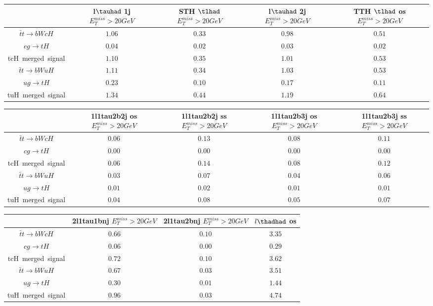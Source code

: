 \centering
\begin{tabular}{|c|c|c|c|c|} \hline
 & l$\tauhad$ 1j  $E_T^{miss}>20GeV$ & STH $\tlhad$   $E_T^{miss}>20GeV$ & l$\tauhad$ 2j  $E_T^{miss}>20GeV$ & TTH $\tlhad$ os  $E_T^{miss}>20GeV$\\\hline
$\bar{t}t\to bWcH$ & $1.06$ & $0.33$ & $0.98$ & $0.51$\\\hline
$cg\to tH$ & $0.04$ & $0.02$ & $0.03$ & $0.02$\\\hline
tcH~merged~signal & $1.10$ & $0.35$ & $1.01$ & $0.53$\\\hline
$\bar{t}t\to bWuH$ & $1.11$ & $0.34$ & $1.03$ & $0.53$\\\hline
$ug\to tH$ & $0.23$ & $0.10$ & $0.17$ & $0.11$\\\hline
tuH~merged~signal & $1.34$ & $0.44$ & $1.19$ & $0.64$\\\hline
\end{tabular}
\begin{tabular}{|c|c|c|c|c|} \hline
 & 1l1tau2b2j os  $E_T^{miss}>20GeV$ & 1l1tau2b2j ss  $E_T^{miss}>20GeV$ & 1l1tau2b3j os  $E_T^{miss}>20GeV$ & 1l1tau2b3j ss  $E_T^{miss}>20GeV$\\\hline
$\bar{t}t\to bWcH$ & $0.06$ & $0.13$ & $0.08$ & $0.11$\\\hline
$cg\to tH$ & $0.00$ & $0.00$ & $0.00$ & $0.00$\\\hline
tcH~merged~signal & $0.06$ & $0.14$ & $0.08$ & $0.12$\\\hline
$\bar{t}t\to bWuH$ & $0.03$ & $0.07$ & $0.04$ & $0.06$\\\hline
$ug\to tH$ & $0.01$ & $0.02$ & $0.01$ & $0.01$\\\hline
tuH~merged~signal & $0.04$ & $0.08$ & $0.05$ & $0.07$\\\hline
\end{tabular}
\begin{tabular}{|c|c|c|c|} \hline
 & 2l1tau1bnj  $E_T^{miss}>20GeV$ & 2l1tau2bnj  $E_T^{miss}>20GeV$ & $l\thadhad$ os\\\hline
$\bar{t}t\to bWcH$ & $0.66$ & $0.10$ & $3.35$\\\hline
$cg\to tH$ & $0.06$ & $0.00$ & $0.29$\\\hline
tcH~merged~signal & $0.72$ & $0.10$ & $3.62$\\\hline
$\bar{t}t\to bWuH$ & $0.67$ & $0.03$ & $3.51$\\\hline
$ug\to tH$ & $0.30$ & $0.01$ & $1.44$\\\hline
tuH~merged~signal & $0.96$ & $0.03$ & $4.74$\\\hline
\end{tabular}
